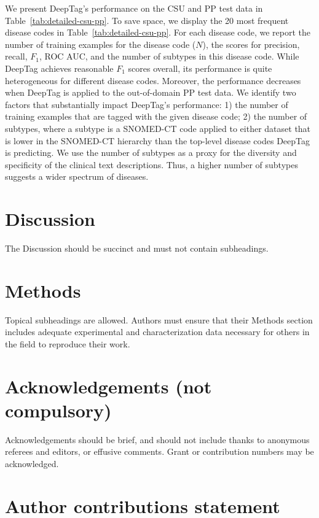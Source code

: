 \documentclass[fleqn,10pt]{wlscirep}
\begin{document}
We present DeepTag's performance on the CSU and PP test data in Table~\ref{tab:detailed-csu-pp}. To save space, we display the 20 most frequent disease codes in Table~\ref{tab:detailed-csu-pp}. For each disease code, we report the number of training examples for the disease code ($N$), the scores for precision, recall, $F_1$, ROC AUC, and the number of subtypes in this disease code. While DeepTag achieves reasonable $F_1$ scores overall, its performance is quite heterogeneous for different disease codes. Moreover, the performance decreases when DeepTag is applied to the out-of-domain PP test data. 
We identify two factors that substantially impact DeepTag's performance: 1) the number of training examples that are tagged with the given disease code; 2) the number of subtypes, where a subtype is a SNOMED-CT code applied to either dataset that is lower in the SNOMED-CT hierarchy than the top-level disease codes DeepTag is predicting. We use the number of subtypes as a proxy for the diversity and specificity of the clinical text descriptions. Thus, a higher number of subtypes suggests a wider spectrum of diseases.

\section*{Discussion}

The Discussion should be succinct and must not contain subheadings.

\section*{Methods}

Topical subheadings are allowed. Authors must ensure that their Methods section includes adequate experimental and characterization data necessary for others in the field to reproduce their work.



\section*{Acknowledgements (not compulsory)}

Acknowledgements should be brief, and should not include thanks to anonymous referees and editors, or effusive comments. Grant or contribution numbers may be acknowledged.

\section*{Author contributions statement}
\end{document}
